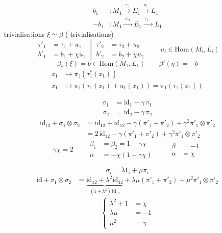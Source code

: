 \documentclass[11pt,a4paper]{article}
\begin{document}
\begin{align*}
b_1 &: M_1\xrightarrow{\ \tau_1\ }E_1\xrightarrow{\ \pi_1\ }L_1\\
-b_1 &: M_1\xrightarrow{\ \varpi_1\ }E_1\xrightarrow{\ \tau_1\cdot\ }L_1
\end{align*}
trivialisations $\xi\simeq\beta$
(\ill{}-trivialisations)
\[
\left.\begin{aligned}
\tau'_1&=\tau_1+u_1\\
b'_1&=b_1+\chi u_1
\end{aligned}\ \right|\
\begin{aligned}
\tau'_2&=\tau_2+u_2\\
b'_2&=b_2+\chi u_2
\end{aligned}
\qquad u_i\in\mathrm{Hom}(M_i,L_i)
\]
\[
\beta_*(\xi)=b\in\mathrm{Hom}(M_1,L_1)\qquad \beta'(\eta)=-b
\]
\begin{align*}
x_1&\mapsto \pi_1(\tau_1^{*}(x_1))\\
x_1&\mapsto \pi_1(\tau_1(x_1)+u_1(x_1))=\pi_1(\tau_1(x_1))
\end{align*}

\begin{align*}
\sigma_1&=\mathrm{id}_1-\gamma\,\pi_1\\
\sigma_2&=\mathrm{id}_2-\gamma\,\pi_2
\end{align*}
\begin{align*}
\mathrm{id}_{12}+\sigma_1\otimes\sigma_2
&=\mathrm{id}_{12}+\mathrm{id}_{12}-\gamma(\pi'_1+\pi'_2)+\gamma^2\pi'_1\otimes\pi'_2\\
&=2\,\mathrm{id}_{12}-\gamma(\pi'_1+\pi'_2)+\gamma^2\pi'_1\otimes\pi'_2
\end{align*}
\[
\boxed{\gamma\chi=2}
\qquad
\begin{aligned}
\beta_1&=\beta_2=1-\gamma\chi\\
\alpha&=-\chi(1-\gamma\chi)
\end{aligned}
\qquad
\boxed{\begin{aligned}\beta&=-1\\ \alpha&=\chi\end{aligned}}
\]

\[
\sigma_i=\lambda 1_i+\mu\pi_i
\]
\begin{align*}
\mathrm{id}+\sigma_1\otimes\sigma_2
&=\underbrace{\mathrm{id}_{12}+\lambda^2\mathrm{id}_{12}}_{(1+\lambda^2)\,\mathrm{id}_{12}}
+\lambda\mu(\pi'_1+\pi'_2)+\mu^2\pi'_1\otimes\pi'_2
\end{align*}
\[
\boxed{\left\{\begin{aligned}
\lambda^2+1&=\chi\\
\lambda\mu&=-1\\
\mu^2&=\gamma
\end{aligned}\right.}
\]
\end{document}
